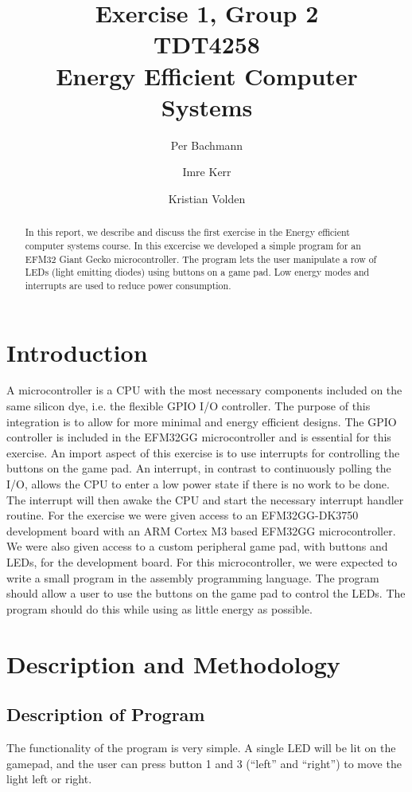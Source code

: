 \documentclass[a4paper, 12pt]{article}
\title{Exercise 1, Group 2 \\ TDT4258 \\ Energy Efficient Computer Systems}
\author{Per Bachmann \and Imre Kerr \and Kristian Volden}
\begin{document}
\maketitle
\begin{abstract}
In this report, we describe and discuss the first exercise in the Energy efficient computer systems course. In this excercise we developed a simple program for an EFM32 Giant Gecko microcontroller. The program lets the user manipulate a row of LEDs (light emitting diodes) using buttons on a game pad. Low energy modes and interrupts are used to reduce power consumption.
\end{abstract}
\section{Introduction} %
\label{sec:introduction}
	A microcontroller is a CPU with the most necessary components included on the same silicon dye, i.e. the flexible GPIO I/O controller. The purpose of this integration is to allow for more minimal and energy efficient designs. The GPIO controller is included in the EFM32GG microcontroller and is essential for this exercise.
	An import aspect of this exercise is to use interrupts for controlling the buttons on the game pad. An interrupt, in contrast to continuously polling the I/O, allows the CPU to enter a low power state if there is no work to be done. The interrupt will then awake the CPU and start the necessary interrupt handler routine.
	For the exercise we were given access to an EFM32GG-DK3750 development board with an ARM Cortex M3 based EFM32GG microcontroller. We were also given access to a custom peripheral game pad, with buttons and LEDs, for the development board. For this microcontroller, we were expected to write a small program in the assembly programming language. The program should allow a user to use the buttons on the game pad to control the LEDs. The program should do this while using as little energy as possible.

\section{Description and Methodology} %
\label{sec:description_and_methodology}
    \subsection{Description of Program} %
    \label{sub:description_of_program}
        The functionality of the program is very simple. A single LED will be lit on the gamepad, and the user can press button 1 and 3 (``left'' and ``right'') to move the light left or right.
\end{document}
